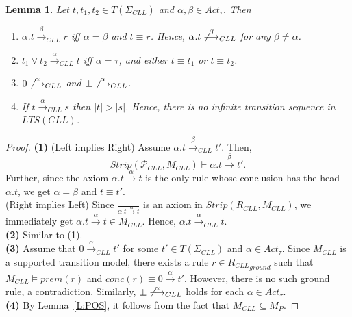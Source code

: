 \documentclass{elsarticle}
\theoremstyle{plain}
\newtheorem{lemma}[theorem]{Lemma}
\theoremstyle{definition}
\begin{document}
\begin{lemma}\label{L:Basic_I}
Let $t,t_1,t_2\in T(\Sigma_{CLL})$ and $\alpha,\beta \in Act_{\tau}$. Then
    \begin{enumerate}
      \item $\alpha.t \stackrel{\beta}{\longrightarrow}_{{CLL}} r$ iff $\alpha = \beta$ and $t \equiv r$. Hence, $\alpha.t \not \stackrel{\beta}{\longrightarrow}_{{CLL}}$ for any $\beta  \neq \alpha$.
      \item $t_1 \vee t_2 \stackrel{\alpha}{\longrightarrow}_{{CLL}} t$ iff $\alpha = \tau$, and either $t \equiv t_1$ or $t \equiv t_2$.
      \item $0 \not\stackrel{\alpha}{\longrightarrow}_{{CLL}}$ and $\bot \not\stackrel{\alpha}{\longrightarrow}_{{CLL}}$.
      \item If $t \stackrel{\alpha}{\longrightarrow}_{{CLL}}s$ then $|t|>|s|$. Hence, there is no infinite transition sequence in $LTS(CLL)$.
    \end{enumerate}
\end{lemma}
\begin{proof}
  \noindent \textbf{(1)} (Left implies Right) Assume $\alpha.t \stackrel{\beta}{\longrightarrow}_{{CLL}} t'$. Then, \[Strip({\mathcal P}_{CLL},M_{{CLL}})\vdash \alpha.t \stackrel{\beta}{\longrightarrow} t'.\]
  Further, since the axiom $\alpha.t \stackrel{\alpha}{\longrightarrow}t$ is the only rule whose conclusion has the head $\alpha.t$, we get
   $\alpha = \beta$ and $t \equiv t'$.\\

  \noindent (Right implies Left) Since $\frac{-}{\alpha.t \stackrel{\alpha}{\longrightarrow} t}$ is an axiom in $Strip(R_{CLL}, M_{CLL})$, we immediately get $\alpha.t \stackrel{\alpha}{\longrightarrow} t \in M_{CLL}$. Hence, $\alpha.t \stackrel{\alpha}{\longrightarrow}_{CLL} t$. \\

  \noindent \textbf{(2)} Similar to (1). \\

  \noindent \textbf{(3)} Assume that $0 \stackrel{\alpha}{\longrightarrow}_{{CLL}}t'$ for some $t'\in T(\Sigma_{CLL})$ and $\alpha \in Act_{\tau}$.
  Since $M_{CLL}$ is a supported transition model, there exists a rule $r \in {R_{CLL}}_{ground}$ such that $M_{CLL}\models prem(r)$ and $conc(r) \equiv 0 \stackrel{\alpha}{\longrightarrow}t'$. However, there is no such ground rule, a contradiction.
  Similarly, $\bot \not\stackrel{\alpha}{\longrightarrow}_{{CLL}}$ holds for each $\alpha \in Act_{\tau}$.\\

  \noindent \textbf{(4)} By Lemma~\ref{L:POS}, it follows from the fact that
   $M_{CLL} \subseteq M_P$.
\end{proof}
\end{document}
